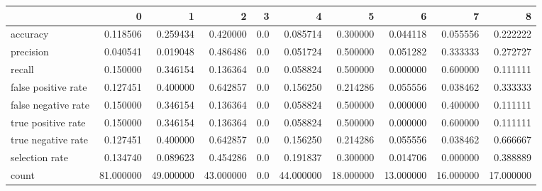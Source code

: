 \begin{tabular}{lrrrrrrrrr}
\toprule
{} &          0 &          1 &          2 &    3 &          4 &          5 &          6 &          7 &          8 \\
\midrule
accuracy            &   0.118506 &   0.259434 &   0.420000 &  0.0 &   0.085714 &   0.300000 &   0.044118 &   0.055556 &   0.222222 \\
precision           &   0.040541 &   0.019048 &   0.486486 &  0.0 &   0.051724 &   0.500000 &   0.051282 &   0.333333 &   0.272727 \\
recall              &   0.150000 &   0.346154 &   0.136364 &  0.0 &   0.058824 &   0.500000 &   0.000000 &   0.600000 &   0.111111 \\
false positive rate &   0.127451 &   0.400000 &   0.642857 &  0.0 &   0.156250 &   0.214286 &   0.055556 &   0.038462 &   0.333333 \\
false negative rate &   0.150000 &   0.346154 &   0.136364 &  0.0 &   0.058824 &   0.500000 &   0.000000 &   0.400000 &   0.111111 \\
true positive rate  &   0.150000 &   0.346154 &   0.136364 &  0.0 &   0.058824 &   0.500000 &   0.000000 &   0.600000 &   0.111111 \\
true negative rate  &   0.127451 &   0.400000 &   0.642857 &  0.0 &   0.156250 &   0.214286 &   0.055556 &   0.038462 &   0.666667 \\
selection rate      &   0.134740 &   0.089623 &   0.454286 &  0.0 &   0.191837 &   0.300000 &   0.014706 &   0.000000 &   0.388889 \\
count               &  81.000000 &  49.000000 &  43.000000 &  0.0 &  44.000000 &  18.000000 &  13.000000 &  16.000000 &  17.000000 \\
\bottomrule
\end{tabular}
